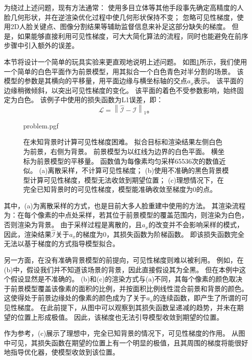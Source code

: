 为绕过上述问题，现有方法通常：
使用多目立体等其他手段事先确定高精度的人脸几何形状，并在逆渲染优化过程中使几何形状保持不变\citep{RiviereGBGB20}；
忽略可见性梯度，使用2D人脸关键点\citep{deep3d}、图像分割\citep{nvdiffrec}结果等辅助监督信息来补足这部分缺失的梯度。
但是，如果能够直接利用可见性梯度，可大大简化算法的流程，同时也能避免在前序步骤中引入额外的误差。

本节将设计一个简单的玩具实验来更直观地说明上述问题。
如图\ref{fig:problem}所示，我们使用一个简单的白色平面作为前景模型，用其拟合一个白色青色对半分割的场景。
该模型的参数是其横向的平移量，用平面边缘与横坐标轴的交点$a_x$表示。
该平面的边缘稍微倾斜，以突出可见性梯度的变化。
该平面的着色不受参数影响，始终固定为白色。
该例子中使用的损失函数为L1误差，即：
\begin{equation}
\mathcal{L} = \left\| \hat{\mathcal{I}} - \mathcal{I} \right\|_1
\text{。}
\label{eq:loss_l1}
\end{equation}

\begin{figure}
\centering
{problem.pgf}
\caption[在未知背景时计算可见性梯度困难]{
    在未知背景时计算可见性梯度困难。
    拟合目标和渲染结果左侧白色为前景，右侧为背景。
    前景模型为以红线为边界的白色平面。
    横坐标为前景模型的平移量。
    函数值为每像素均匀采样65536次的数值近似。
    (a)离散采样，不计算可见性梯度；
    (b)使用不准确的黑色背景模型计算可见性梯度，模型无法收敛到期望位置；
    (c)理想情况下，在完全已知背景时的可见性梯度，模型能准确收敛至梯度为0的点。
}
\label{fig:problem}
\end{figure}

其中，(a)为离散采样的方式，也是目前大多人脸重建中使用的方法。
其渲染流程为：在每个像素的中点处采样，若其位于前景模型的覆盖范围内，则渲染为白色，否则渲染为背景。
由于采样过程是离散的，且$a_x$的改变并不会影响采样的模式，因此，渲染结果$\hat{\mathcal{I}}$关于$a_x$的梯度为0，其损失函数为阶梯函数。
即该损失函数完全无法以基于梯度的方式指导模型拟合。

另一方面，在没有准确背景模型的前提向，可见性梯度则难以被利用。
例如，在(b)中，假设我们并不知道该场景的背景，因此直接假设其为全黑。
但在本例中这个假设显然是不准确的。
(b)和(c)的渲染方式与(a)不同，其每个像素的颜色取决于前景模型覆盖该像素的面积的比例，并按面积比例线性混合前景和背景的颜色。
这使得处于前景边缘处的像素的颜色成为了关于$a_x$的连续函数，即产生了所谓的可见性梯度。
在此前提下，从图中可以观察到其损失函数呈递减的趋势，并未在期望的位置上形成极值。
因此，该梯度也无法引导模型收敛到期望的位置。

作为参考，(c)展示了理想中，完全已知背景的情况下，可见性梯度的作用。
从图中可见，其损失函数在期望的位置上有一个明显的极值，且其周围的梯度将能很好地指导优化器，使模型收敛到该位置。


